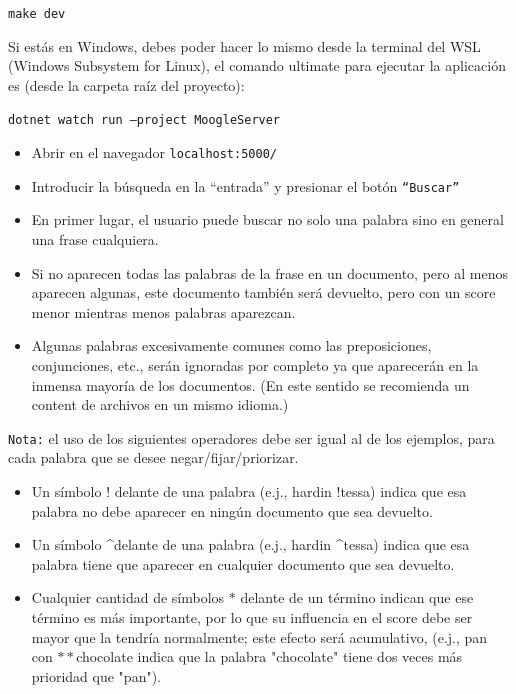 \documentclass[a4paper, 12pt]{article}
\begin{document}
{\tt make dev}
\vspace{0.5cm}

Si estás en Windows, debes poder hacer lo mismo desde la terminal del WSL (Windows Subsystem for Linux), el comando ultimate para ejecutar la aplicación es (desde la carpeta raíz del proyecto):
\vspace{0.5cm}

{\tt dotnet watch run --project MoogleServer}
\begin{itemize}
    \item Abrir en el navegador {\tt localhost:5000/}
    \item Introducir la b\'usqueda en la ``entrada'' y presionar el bot\'on {\tt ``Buscar''}
\end{itemize}

\begin{itemize}
    \item En primer lugar, el usuario puede buscar no solo una palabra sino en general una frase cualquiera.
    \item Si no aparecen todas las palabras de la frase en un documento, pero al menos aparecen algunas, este documento también será devuelto, pero con un score menor mientras menos palabras aparezcan.
    \item Algunas palabras excesivamente comunes como las preposiciones, conjunciones, etc., serán ignoradas por completo ya que aparecerán en la inmensa mayoría de los documentos. (En este sentido se recomienda un content de archivos en un mismo idioma.)
\end{itemize}


{\tt Nota:} el uso de los siguientes operadores debe ser igual al de los ejemplos, para cada palabra que se desee negar/fijar/priorizar.
\begin{itemize}
    \item Un símbolo $!$ delante de una palabra (e.j., hardin $!$tessa) indica que esa palabra no debe aparecer en ningún documento que sea devuelto.
    \item Un símbolo \textasciicircum delante de una palabra (e.j., hardin \textasciicircum tessa) indica que esa palabra tiene que aparecer en cualquier documento que sea devuelto.
    \item Cualquier cantidad de símbolos $*$ delante de un término indican que ese término es más importante, por lo que su influencia en el score debe ser mayor que la tendría normalmente; este efecto será acumulativo, (e.j., pan con $**$chocolate indica que la palabra "chocolate" tiene dos veces más prioridad que "pan").
\end{itemize}
\end{document}
